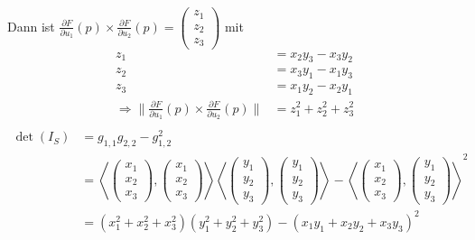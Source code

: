 \begin{beweis}
    Dann ist $\frac{\partial F}{\partial u_1}(p) \times \frac{\partial F}{\partial u_2}(p) = \begin{pmatrix}
        z_1 \\ z_2 \\ z_3
    \end{pmatrix}$ mit
    \begin{align*}
        z_1 &= x_2 y_3 - x_3 y_2\\
        z_2 &= x_3 y_1 - x_1 y_3\\
        z_3 &= x_1 y_2 - x_2 y_1\\
    \Rightarrow \|\frac{\partial F}{\partial u_1} (p) \times \frac{\partial F}{\partial u_2} (p)\| &= z_1^2 + z_2^2 + z_3^2\\
    \end{align*}
    \begin{align*}
        \det(I_S) &= g_{1,1} g_{2,2} - g_{1,2}^2\\
        &= \left \langle \begin{pmatrix} x_1 \\ x_2 \\ x_3 \end{pmatrix}, \begin{pmatrix} x_1 \\ x_2 \\ x_3 \end{pmatrix} \right \rangle \left \langle \begin{pmatrix} y_1 \\ y_2 \\ y_3 \end{pmatrix}, \begin{pmatrix} y_1 \\ y_2 \\ y_3 \end{pmatrix} \right \rangle - \left \langle \begin{pmatrix} x_1 \\ x_2 \\ x_3 \end{pmatrix}, \begin{pmatrix} y_1 \\ y_2 \\ y_3 \end{pmatrix} \right \rangle^2\\
        &= (x_1^2 + x_2^2 + x_3^2) (y_1^2 + y_2^2 + y_3^2) - (x_1 y_1 + x_2 y_2 + x_3 y_3)^2
    \end{align*}
\end{beweis}

